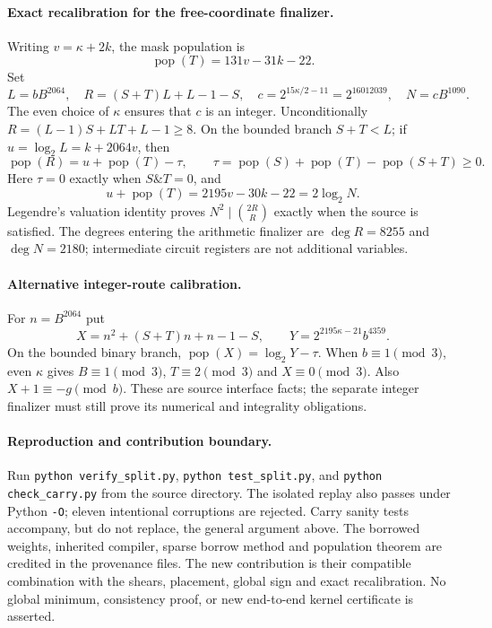 \paragraph{Exact recalibration for the free-coordinate finalizer.}
Writing $v=\kappa+2k$, the mask population is
\[
 \operatorname{pop}(T)=131v-31k-22.
\]
Set
\[
 L=bB^{2064},\quad R=(S+T)L+L-1-S,\quad
 c=2^{15\kappa/2-11}=2^{16012039},\quad N=cB^{1090}.
\]
The even choice of $\kappa$ ensures that $c$ is an integer. Unconditionally
$R=(L-1)S+LT+L-1\ge8$. On the bounded branch $S+T<L$; if
$u=\log_2L=k+2064v$, then
\[
 \operatorname{pop}(R)=u+\operatorname{pop}(T)-\tau,
 \qquad \tau=\operatorname{pop}(S)+\operatorname{pop}(T)
                  -\operatorname{pop}(S+T)\ge0.
\]
Here $\tau=0$ exactly when $S\mathbin{\&}T=0$, and
\[
 u+\operatorname{pop}(T)=2195v-30k-22=2\log_2N.
\]
Legendre's valuation identity proves
$N^2\mid\binom{2R}{R}$ exactly when the source is satisfied.
The degrees entering the arithmetic finalizer are $\deg R=8255$ and
$\deg N=2180$; intermediate circuit registers are not additional variables.

\paragraph{Alternative integer-route calibration.}
For $n=B^{2064}$ put
\[
 X=n^2+(S+T)n+n-1-S,\qquad
 Y=2^{2195\kappa-21}b^{4359}.
\]
On the bounded binary branch,
$\operatorname{pop}(X)=\log_2Y-\tau$.
When $b\equiv1\pmod3$, even $\kappa$ gives $B\equiv1\pmod3$,
$T\equiv2\pmod3$ and $X\equiv0\pmod3$.
Also $X+1\equiv-g\pmod b$. These are source interface facts; the separate
integer finalizer must still prove its numerical and integrality obligations.

\paragraph{Reproduction and contribution boundary.}
Run \texttt{python verify\_split.py}, \texttt{python test\_split.py}, and
\texttt{python check\_carry.py} from the source directory.
The isolated replay also passes under Python \texttt{-O}; eleven intentional
corruptions are rejected. Carry sanity tests accompany, but do not replace,
the general argument above. The borrowed weights, inherited compiler, sparse
borrow method and population theorem are credited in the provenance files.
The new contribution is their compatible combination with the shears,
placement, global sign and exact recalibration. No global minimum, consistency
proof, or new end-to-end kernel certificate is asserted.
